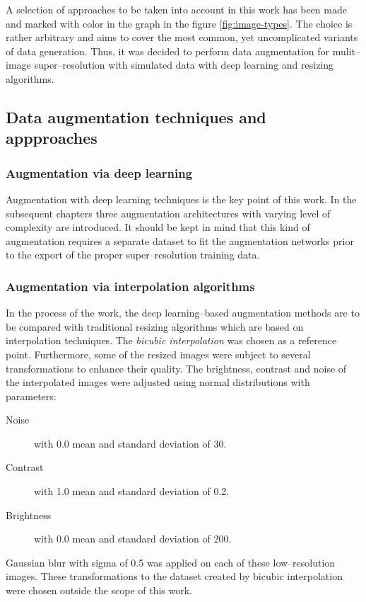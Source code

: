 A selection of approaches to be taken into account in this work has been made and marked with color in the graph in the figure \ref{fig:image-types}.
The choice is rather arbitrary and aims to cover the most common, yet uncomplicated variants of data generation.
Thus, it was decided to perform data augmentation for mulit--image super--resolution with simulated data with deep learning and resizing algorithms.

\subsection{Data augmentation techniques and appproaches}
\subsubsection{Augmentation via deep learning}
Augmentation with deep learning techniques is the key point of this work.
In the subsequent chapters three augmentation architectures with varying level of complexity are introduced.
It should be kept in mind that this kind of augmentation requires a separate dataset to fit the augmentation networks prior to the export of the proper super--resolution training data.

\subsubsection{Augmentation via interpolation algorithms}
In the process of the work, the deep learning--based augmentation methods are to be compared with traditional resizing algorithms which are based on interpolation techniques.
The \textit{bicubic interpolation} was chosen as a reference point.
Furthermore, some of the resized images were subject to several transformations to enhance their quality.
The brightness, contrast and noise of the interpolated images were adjusted using normal distributions with parameters:
\begin{description}
	\item[Noise] with 0.0 mean and standard deviation of 30.
	\item[Contrast] with 1.0 mean and standard deviation of 0.2.
	\item[Brightness] with 0.0 mean and standard deviation of 200.
\end{description}
Gaussian blur with sigma of 0.5 was applied on each of these low--resolution images.
These transformations to the dataset created by bicubic interpolation were chosen outside the scope of this work.

